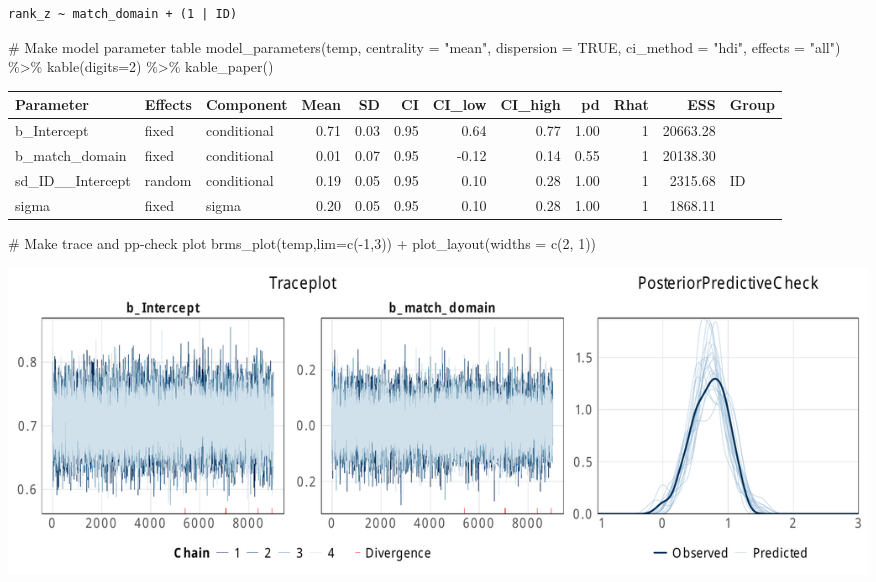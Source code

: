 \documentclass[
  letterpaper,
  DIV=11,
  numbers=noendperiod]{scrartcl}
\newenvironment{Shaded}{\begin{snugshade}}{\end{snugshade}}
\newcommand{\AttributeTok}[1]{\textcolor[rgb]{0.40,0.45,0.13}{#1}}
\newcommand{\CommentTok}[1]{\textcolor[rgb]{0.37,0.37,0.37}{#1}}
\newcommand{\ConstantTok}[1]{\textcolor[rgb]{0.56,0.35,0.01}{#1}}
\newcommand{\DecValTok}[1]{\textcolor[rgb]{0.68,0.00,0.00}{#1}}
\newcommand{\FunctionTok}[1]{\textcolor[rgb]{0.28,0.35,0.67}{#1}}
\newcommand{\NormalTok}[1]{\textcolor[rgb]{0.00,0.23,0.31}{#1}}
\newcommand{\SpecialCharTok}[1]{\textcolor[rgb]{0.37,0.37,0.37}{#1}}
\newcommand{\StringTok}[1]{\textcolor[rgb]{0.13,0.47,0.30}{#1}}
\begin{document}
\begin{verbatim}
rank_z ~ match_domain + (1 | ID) 
\end{verbatim}

\begin{Shaded}
\begin{Highlighting}[]
\CommentTok{\# Make model parameter table}
\FunctionTok{model\_parameters}\NormalTok{(temp, }\AttributeTok{centrality =} \StringTok{"mean"}\NormalTok{, }\AttributeTok{dispersion =} \ConstantTok{TRUE}\NormalTok{, }
                 \AttributeTok{ci\_method =} \StringTok{"hdi"}\NormalTok{, }\AttributeTok{effects =} \StringTok{"all"}\NormalTok{) }\SpecialCharTok{\%\textgreater{}\%} 
  \FunctionTok{kable}\NormalTok{(}\AttributeTok{digits=}\DecValTok{2}\NormalTok{) }\SpecialCharTok{\%\textgreater{}\%} \FunctionTok{kable\_paper}\NormalTok{()}
\end{Highlighting}
\end{Shaded}

\begin{longtable*}[t]{lllrrrrrrrrl}
\toprule
Parameter & Effects & Component & Mean & SD & CI & CI\_low & CI\_high & pd & Rhat & ESS & Group\\
\midrule
b\_Intercept & fixed & conditional & 0.71 & 0.03 & 0.95 & 0.64 & 0.77 & 1.00 & 1 & 20663.28 & \\
b\_match\_domain & fixed & conditional & 0.01 & 0.07 & 0.95 & -0.12 & 0.14 & 0.55 & 1 & 20138.30 & \\
sd\_ID\_\_Intercept & random & conditional & 0.19 & 0.05 & 0.95 & 0.10 & 0.28 & 1.00 & 1 & 2315.68 & ID\\
sigma & fixed & sigma & 0.20 & 0.05 & 0.95 & 0.10 & 0.28 & 1.00 & 1 & 1868.11 & \\
\bottomrule
\end{longtable*}

\begin{Shaded}
\begin{Highlighting}[]
\CommentTok{\# Make trace and pp{-}check plot}
\FunctionTok{brms\_plot}\NormalTok{(temp,}\AttributeTok{lim=}\FunctionTok{c}\NormalTok{(}\SpecialCharTok{{-}}\DecValTok{1}\NormalTok{,}\DecValTok{3}\NormalTok{))  }\SpecialCharTok{+} \FunctionTok{plot\_layout}\NormalTok{(}\AttributeTok{widths =} \FunctionTok{c}\NormalTok{(}\DecValTok{2}\NormalTok{, }\DecValTok{1}\NormalTok{))}
\end{Highlighting}
\end{Shaded}

\includegraphics{supplement_files/figure-pdf/h1bM1CO2-1.pdf}
\end{document}
